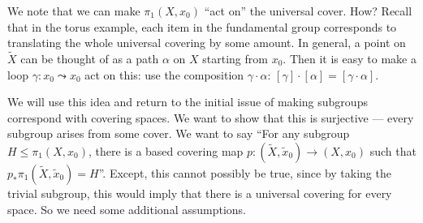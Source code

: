 \documentclass[a4paper]{article}
\begin{document}
We note that we can make $\pi_1(X, x_0)$ ``act on'' the universal cover. How? Recall that in the torus example, each item in the fundamental group corresponds to translating the whole universal covering by some amount. In general, a point on $\tilde{X}$ can be thought of as a path $\alpha$ on $X$ starting from $x_0$. Then it is easy to make a loop $\gamma: x_0 \leadsto x_0$ act on this: use the composition $\gamma\cdot \alpha$: $[\gamma]\cdot [\alpha] = [\gamma \cdot \alpha]$.
\begin{center}
\end{center}
We will use this idea and return to the initial issue of making subgroups correspond with covering spaces. We want to show that this is surjective --- every subgroup arises from some cover. We want to say ``For any subgroup $H \leq \pi_1(X, x_0)$, there is a based covering map $p: (\tilde{X}, \tilde{x}_0)\to (X, x_0)$ such that $p_* \pi_1(\tilde{X}, \tilde{x}_0) = H$''. Except, this cannot possibly be true, since by taking the trivial subgroup, this would imply that there is a universal covering for every space. So we need some additional assumptions.
\end{document}
